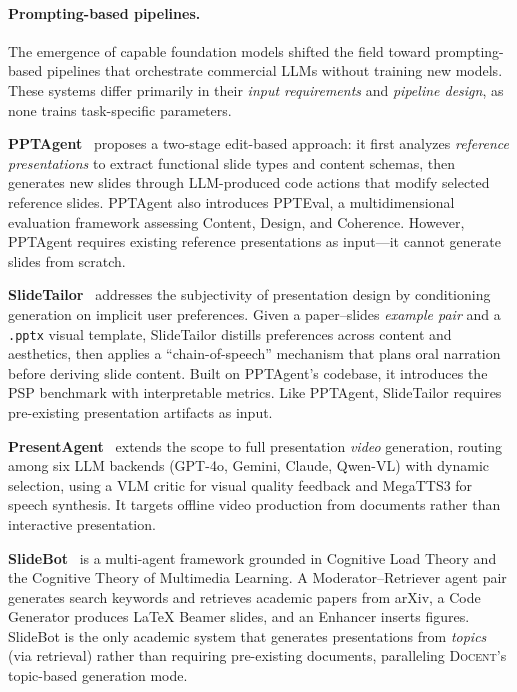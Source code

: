 \documentclass[11pt,a4paper]{article}
\newcommand{\system}{\textsc{Docent}\xspace}
\begin{document}
\paragraph{Prompting-based pipelines.}
The emergence of capable foundation models shifted the field toward prompting-based pipelines that orchestrate commercial LLMs without training new models.
These systems differ primarily in their \emph{input requirements} and \emph{pipeline design}, as none trains task-specific parameters.

\textbf{PPTAgent}~\citep{zheng2025pptagent} proposes a two-stage edit-based approach: it first analyzes \emph{reference presentations} to extract functional slide types and content schemas, then generates new slides through LLM-produced code actions that modify selected reference slides.
PPTAgent also introduces PPTEval, a multidimensional evaluation framework assessing Content, Design, and Coherence.
However, PPTAgent requires existing reference presentations as input---it cannot generate slides from scratch.

\textbf{SlideTailor}~\citep{zeng2026slidetailor} addresses the subjectivity of presentation design by conditioning generation on implicit user preferences.
Given a paper--slides \emph{example pair} and a \texttt{.pptx} visual template, SlideTailor distills preferences across content and aesthetics, then applies a ``chain-of-speech'' mechanism that plans oral narration before deriving slide content.
Built on PPTAgent's codebase, it introduces the PSP benchmark with interpretable metrics.
Like PPTAgent, SlideTailor requires pre-existing presentation artifacts as input.

\textbf{PresentAgent}~\citep{wu2025presentagent} extends the scope to full presentation \emph{video} generation, routing among six LLM backends (GPT-4o, Gemini, Claude, Qwen-VL) with dynamic selection, using a VLM critic for visual quality feedback and MegaTTS3 for speech synthesis.
It targets offline video production from documents rather than interactive presentation.

\textbf{SlideBot}~\citep{xie2026slidebot} is a multi-agent framework grounded in Cognitive Load Theory and the Cognitive Theory of Multimedia Learning.
A Moderator--Retriever agent pair generates search keywords and retrieves academic papers from arXiv, a Code Generator produces LaTeX Beamer slides, and an Enhancer inserts figures.
SlideBot is the only academic system that generates presentations from \emph{topics} (via retrieval) rather than requiring pre-existing documents, paralleling \system's topic-based generation mode.
\end{document}
